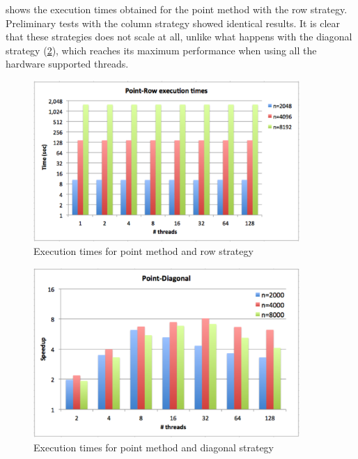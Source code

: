\documentclass[../thesis]{subfiles}
\begin{document}
	 shows the execution times obtained for the point method with the row strategy. Preliminary tests with the column strategy showed identical results. It is clear that these strategies does not scale at all, unlike what happens with the diagonal strategy (\cref{fig:multicore:point:diagonal:times}), which reaches its maximum performance when using all the hardware supported threads.

	\begin{figure}[hp]
		\begin{center}
			\includegraphics[width=0.9\textwidth]{assets/images/multicore/point-row.png}
		\end{center}
		\caption{Execution times for point method and row strategy}
		\label{fig:multicore:point:row:times}
	\end{figure}

	\begin{figure}[hp]
		\begin{center}
			\includegraphics[width=0.9\textwidth]{assets/images/multicore/point-diagonal.png}
		\end{center}
		\caption{Execution times for point method and diagonal strategy}
		\label{fig:multicore:point:diagonal:times}
	\end{figure}
\end{document}
